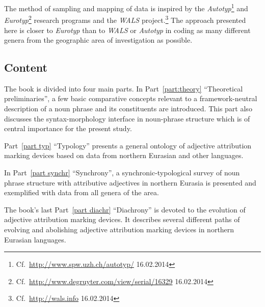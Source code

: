 The method of sampling and mapping of data is inspired by the \emph{Autotyp}\footnote{Cf.~\url{http://www.spw.uzh.ch/autotyp/} 16.02.2014} and \emph{Eurotyp}\footnote{Cf.~\url{http://www.degruyter.com/view/serial/16329} 16.02.2014} research programs and the \emph{WALS} project.\footnote{Cf.~\url{http://wals.info} 16.02.2014} The approach presented here is closer to \emph{Eurotyp} than to \emph{WALS} or \emph{Autotyp} in coding as many different genera from the geographic area of investigation as possible.

\subsection*{Content}
The book is divided into four main parts. In Part~\ref{part:theory} “Theoretical preliminaries”, a few basic comparative concepts relevant to a framework-neutral description of a noun phrase and its constituents are introduced. This part also discusses the syntax-morphology interface in noun-phrase structure which is of central importance for the present study.

Part~\ref{part typ} “Typology” presents a general ontology of adjective attribution marking devices based on data from northern Eurasian and other languages.

In Part~\ref{part synchr} “Synchrony”, a synchronic-typological survey of noun phrase structure with attributive adjectives in northern Eurasia is presented and exemplified with data from all genera of the area.

The book's last Part~\ref{part diachr} “Diachrony” is devoted to the evolution of adjective attribution marking devices. It describes several different paths of evolving and abolishing adjective attribution marking devices in northern Eurasian languages.
